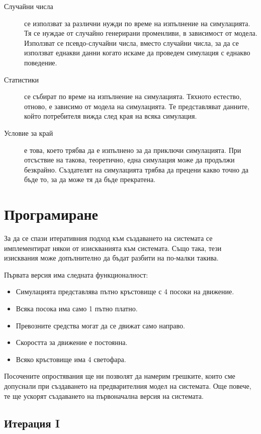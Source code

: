 \begin{description}
				\item[Случайни числа] се използват за различни нужди по време на изпълнение на симулацията.
				Тя се нуждае от случайно генерирани променливи, в зависимост от модела. 
				Използват се псевдо-случайни числа, вместо случайни числа, за да се използват
				еднакви данни когато искаме да проведем симулация с еднакво поведение.				
				
				\item[Статистики] се събират по време на изпълнение на симулацията. Тяхното естество, отново, е зависимо от модела
				на симулацията. Те представляват данните, който потребителя вижда след края на всяка симулация.				
				
				\item[Условие за край] е това, което трябва да е изпълнено за да приключи симулацията. 
				При отсъствие на такова, теоретично, една симулация може да продължи безкрайно.
				Създателят на симулацията трябва да прецени какво точно да бъде то, 
				за да може тя да бъде прекратена.
				
			\end{description}	
			
\section{Програмиране}

	За да се спази итеративния подход към създаването на системата
	се имплементират някои от изискванията към системата. Също така,
	тези изисквания може допълнително да бъдат разбити на по-малки такива.
	
	Първата версия има следната функционалност:
	\begin{itemize}
		\item Симулацията представлява пътно кръстовище с 4 посоки на движение.
		\item Всяка посока има само 1 пътно платно.
		\item Превозните средства могат да се движат само направо.
		\item Скоростта за движение е постоянна.
		\item Всяко кръстовище има 4 светофара.
	\end{itemize}
	
	Посочените опростявания ще ни позволят да намерим грешките, които сме допуснали
	при създаването на предварителния модел на системата. Още повече, 
	те ще ускорят създаването на първоначална версия на системата.
	
	\subsection{Итерация I}

